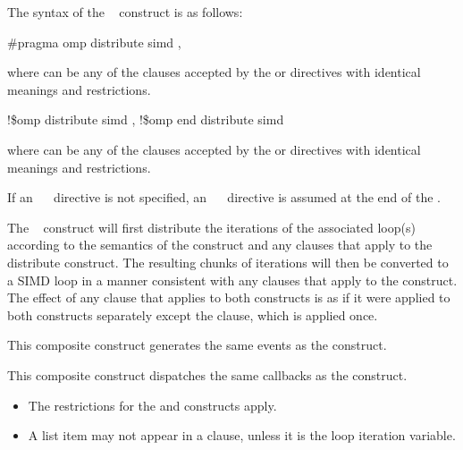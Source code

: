 \syntax
The syntax of the ~ construct is as follows:

\begin{ccppspecific}
\begin{boxedcode}
\#pragma omp distribute simd \plc{[clause[ [},\plc{] clause] ... ] newline}
\end{boxedcode}

where  can be any of the clauses accepted by the  or  
directives with identical meanings and restrictions.
\end{ccppspecific}

\begin{fortranspecific}
\begin{boxedcode}
!\$omp distribute simd \plc{[clause[ [},\plc{] clause] ... ]}
\plc{[}!\$omp end distribute simd\plc{]}
\end{boxedcode}

where  can be any of the clauses accepted by the  or  
directives with identical meanings and restrictions.

If an ~~ directive is not specified, an ~~
directive is assumed at the end of the .
\end{fortranspecific}

\descr
The ~ construct will first distribute the iterations of the associated 
loop(s) according to the semantics of the  construct and any clauses that 
apply to the distribute construct. The resulting chunks of iterations will then be 
converted to a SIMD loop in a manner consistent with any clauses that apply to the 
 construct. The effect of any clause that applies to both constructs is as if it were applied to both constructs separately except the  clause, which is applied once.

\events

This composite construct generates the same events as the  construct.

\tools

This composite construct dispatches the same callbacks as the  construct.

\restrictions
\begin{itemize}
\item The restrictions for the  and  constructs apply.

\item A list item may not appear in a  clause, unless it is the loop iteration variable.
\end{itemize}

